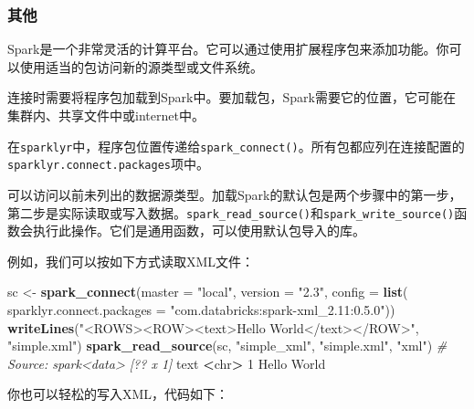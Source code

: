 \documentclass[
]{article}
\newenvironment{Shaded}{\begin{snugshade}}{\end{snugshade}}
\newcommand{\CommentTok}[1]{\textcolor[rgb]{0.56,0.35,0.01}{\textit{#1}}}
\newcommand{\DataTypeTok}[1]{\textcolor[rgb]{0.13,0.29,0.53}{#1}}
\newcommand{\DecValTok}[1]{\textcolor[rgb]{0.00,0.00,0.81}{#1}}
\newcommand{\KeywordTok}[1]{\textcolor[rgb]{0.13,0.29,0.53}{\textbf{#1}}}
\newcommand{\NormalTok}[1]{#1}
\newcommand{\OperatorTok}[1]{\textcolor[rgb]{0.81,0.36,0.00}{\textbf{#1}}}
\newcommand{\StringTok}[1]{\textcolor[rgb]{0.31,0.60,0.02}{#1}}
\begin{document}
\hypertarget{ux5176ux4ed6}{%
\subsubsection{其他}\label{ux5176ux4ed6}}

Spark是一个非常灵活的计算平台。它可以通过使用扩展程序包来添加功能。你可以使用适当的包访问新的源类型或文件系统。

连接时需要将程序包加载到Spark中。要加载包，Spark需要它的位置，它可能在集群内、共享文件中或internet中。

在\texttt{sparklyr}中，程序包位置传递给\texttt{spark\_connect()}。所有包都应列在连接配置的\texttt{sparklyr.connect.packages}项中。

可以访问以前未列出的数据源类型。加载Spark的默认包是两个步骤中的第一步，第二步是实际读取或写入数据。\texttt{spark\_read\_source()}和\texttt{spark\_write\_source()}函数会执行此操作。它们是通用函数，可以使用默认包导入的库。

例如，我们可以按如下方式读取XML文件：

\begin{Shaded}
\begin{Highlighting}[]
\NormalTok{sc <-}\StringTok{ }\KeywordTok{spark_connect}\NormalTok{(}\DataTypeTok{master =} \StringTok{"local"}\NormalTok{, }\DataTypeTok{version =} \StringTok{"2.3"}\NormalTok{, }\DataTypeTok{config =} \KeywordTok{list}\NormalTok{(}
\DataTypeTok{sparklyr.connect.packages =} \StringTok{"com.databricks:spark-xml_2.11:0.5.0"}\NormalTok{))}
\KeywordTok{writeLines}\NormalTok{(}\StringTok{"<ROWS><ROW><text>Hello World</text></ROW>"}\NormalTok{, }\StringTok{"simple.xml"}\NormalTok{)}
\KeywordTok{spark_read_source}\NormalTok{(sc, }\StringTok{"simple_xml"}\NormalTok{, }\StringTok{"simple.xml"}\NormalTok{, }\StringTok{"xml"}\NormalTok{)}
\CommentTok{# Source: spark<data> [?? x 1]}
\NormalTok{ text}
 \OperatorTok{<}\NormalTok{chr}\OperatorTok{>}
\DecValTok{1}\NormalTok{ Hello World}
\end{Highlighting}
\end{Shaded}

你也可以轻松的写入XML，代码如下：

\begin{Shaded}
\end{Shaded}
\end{document}
